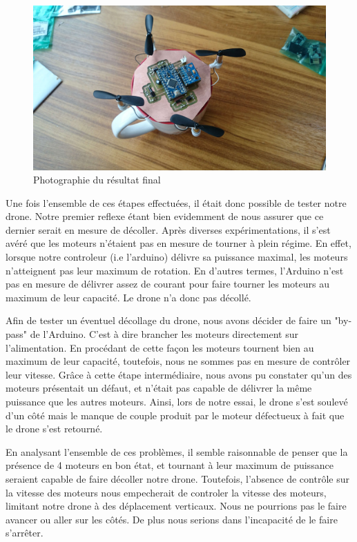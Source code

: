 \documentclass[a4paper,10pt]{report}
\begin{document}
	  \begin{figure}[htbp]
	    \centering
	    \includegraphics[scale = 0.1]{img/drone_photo.jpg}
	    \caption{Photographie du résultat final}
	    \label{droneres}
	  \end{figure}
	
	
	Une fois l'ensemble de ces étapes effectuées, il était donc possible de 
tester notre drone. Notre premier reflexe étant bien evidemment de nous assurer 
que ce dernier serait en mesure de décoller. Après diverses expérimentations, 
il s'est avéré que les moteurs n'étaient pas en mesure de tourner à plein 
régime. En effet, lorsque notre controleur (i.e l'arduino) délivre sa puissance 
maximal, les moteurs n'atteignent pas leur maximum de rotation. En d'autres 
termes, l'Arduino n'est pas en mesure de délivrer assez de courant pour faire 
tourner les moteurs au maximum de leur capacité. Le drone n'a donc pas décollé.

	Afin de tester un éventuel décollage du drone, nous avons décider de 
faire un "by-pass" de l'Arduino. C'est à dire brancher les moteurs directement 
sur l'alimentation. En procédant de cette façon les moteurs tournent bien au 
maximum de leur capacité, toutefois, nous ne sommes pas en mesure de contrôler 
leur vitesse. Grâce à cette étape intermédiaire, nous avons pu constater qu'un 
des moteurs présentait un défaut, et n'était pas capable de délivrer la même 
puissance que les autres moteurs. Ainsi, lors de notre essai, le drone s'est 
soulevé d'un côté mais le manque de couple produit par le moteur défectueux à 
fait que le drone s'est retourné.

	  En analysant l'ensemble de ces problèmes, il semble raisonnable de 
penser que la présence de 4 moteurs en bon état, et tournant à leur maximum de 
puissance seraient capable de faire décoller notre drone. Toutefois, l'absence 
de contrôle sur la vitesse des moteurs nous empecherait de controler la vitesse 
des moteurs, limitant notre drone à des déplacement verticaux.  Nous ne 
pourrions pas le faire avancer ou aller sur les côtés. De plus nous serions 
dans l'incapacité de le faire s'arrêter.
\end{document}
